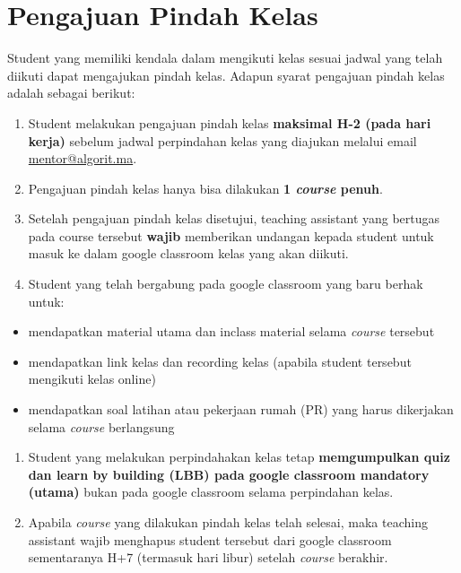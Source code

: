 \documentclass[
]{book}
\providecommand{\tightlist}{%
  \setlength{\itemsep}{0pt}\setlength{\parskip}{0pt}}
\begin{document}
\hypertarget{pengajuan-pindah-kelas}{%
\section{Pengajuan Pindah Kelas}\label{pengajuan-pindah-kelas}}

Student yang memiliki kendala dalam mengikuti kelas sesuai jadwal yang telah diikuti dapat mengajukan pindah kelas. Adapun syarat pengajuan pindah kelas adalah sebagai berikut:

\begin{enumerate}
\def\labelenumi{\arabic{enumi}.}
\tightlist
\item
  Student melakukan pengajuan pindah kelas \textbf{maksimal H-2 (pada hari kerja)} sebelum jadwal perpindahan kelas yang diajukan melalui email \url{mentor@algorit.ma}.
\item
  Pengajuan pindah kelas hanya bisa dilakukan \textbf{1 \emph{course} penuh}.
\item
  Setelah pengajuan pindah kelas disetujui, teaching assistant yang bertugas pada course tersebut \textbf{wajib} memberikan undangan kepada student untuk masuk ke dalam google classroom kelas yang akan diikuti.
\item
  Student yang telah bergabung pada google classroom yang baru berhak untuk:
\end{enumerate}

\begin{itemize}
\tightlist
\item
  mendapatkan material utama dan inclass material selama \emph{course} tersebut
\item
  mendapatkan link kelas dan recording kelas (apabila student tersebut mengikuti kelas online)
\item
  mendapatkan soal latihan atau pekerjaan rumah (PR) yang harus dikerjakan selama \emph{course} berlangsung
\end{itemize}

\begin{enumerate}
\def\labelenumi{\arabic{enumi}.}
\setcounter{enumi}{4}
\tightlist
\item
  Student yang melakukan perpindahakan kelas tetap \textbf{memgumpulkan quiz dan learn by building (LBB) pada google classroom mandatory (utama)} bukan pada google classroom selama perpindahan kelas.
\item
  Apabila \emph{course} yang dilakukan pindah kelas telah selesai, maka teaching assistant wajib menghapus student tersebut dari google classroom sementaranya H+7 (termasuk hari libur) setelah \emph{course} berakhir.
\end{enumerate}
\end{document}
